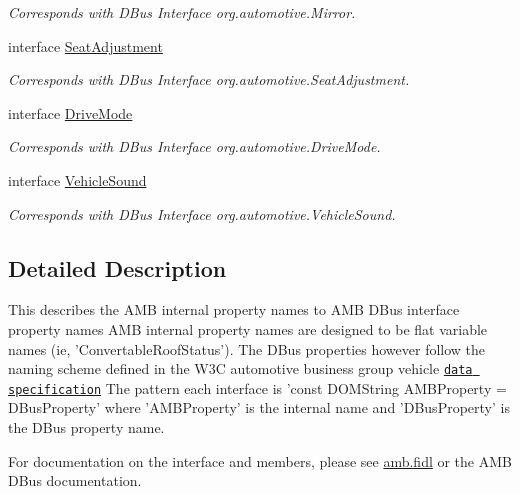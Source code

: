 \begin{DoxyCompactItemize}
\begin{DoxyCompactList}\small\item\em Corresponds with D\+Bus Interface org.\+automotive.\+Mirror. \end{DoxyCompactList}\item 
interface \hyperlink{interfaceSeatAdjustment}{Seat\+Adjustment}
\begin{DoxyCompactList}\small\item\em Corresponds with D\+Bus Interface org.\+automotive.\+Seat\+Adjustment. \end{DoxyCompactList}\item 
interface \hyperlink{interfaceDriveMode}{Drive\+Mode}
\begin{DoxyCompactList}\small\item\em Corresponds with D\+Bus Interface org.\+automotive.\+Drive\+Mode. \end{DoxyCompactList}\item 
interface \hyperlink{interfaceVehicleSound}{Vehicle\+Sound}
\begin{DoxyCompactList}\small\item\em Corresponds with D\+Bus Interface org.\+automotive.\+Vehicle\+Sound. \end{DoxyCompactList}\end{DoxyCompactItemize}


\subsection{Detailed Description}
This describes the A\+M\+B internal property names to A\+M\+B D\+Bus interface property names A\+M\+B internal property names are designed to be flat variable names (ie, 'Convertable\+Roof\+Status'). The D\+Bus properties however follow the naming scheme defined in the W3\+C automotive business group vehicle \href{http://w3c.github.io/automotive-bg/data_spec.html}{\tt data specification} The pattern each interface is 'const D\+O\+M\+String A\+M\+B\+Property = D\+Bus\+Property' where 'A\+M\+B\+Property' is the internal name and 'D\+Bus\+Property' is the D\+Bus property name. 

For documentation on the interface and members, please see \hyperlink{amb_8fidl}{amb.\+fidl} or the A\+M\+B D\+Bus documentation. 